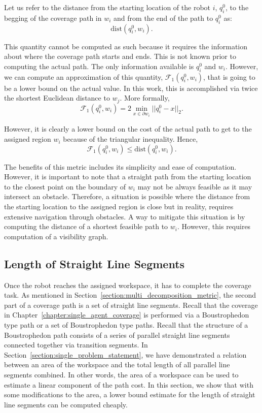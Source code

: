 \documentclass[../main.tex]{subfiles}
\begin{document}
Let us refer to the distance from the starting location of the robot $i$, $q^0_i$, to the begging of the coverage path in $w_i$ and from the end of the path to $q^0_i$ as:
\begin{equation}
	\text{dist}(q^0_i,w_i).
\end{equation}

This quantity cannot be computed as such because it requires the information about where the coverage path starts and ends. This is not known prior to computing the actual path. The only information available is $q^0_i$ and $w_i$. However, we can compute an approximation of this quantity, $\mathcal{F}_1(q^0_i,w_i)$, that is going to be a lower bound on the actual value. In this work, this is accomplished via twice the shortest Euclidean distance to $w_j$. More formally, 
\begin{equation}
	\mathcal{F}_1(q^0_i,w_i)=2\min_{x\in\partial w_i}||q^0_i-x||_2.
\end{equation}

However, it is clearly a lower bound on the cost of the actual path to get to the assigned region $w_i$ because of the triangular inequality. Hence,
\begin{equation}
	\mathcal{F}_1(q^0_i,w_i)\leq\text{dist}(q^0_i,w_i).
\end{equation}

The benefits of this metric includes its simplicity and ease of computation. However, it is important to note that a straight path from the starting location to the closest point on the boundary of $w_i$ may not be always feasible as it may intersect an obstacle. Therefore, a situation is possible where the distance from the starting location to the assigned region is close but in reality, requires extensive navigation through obstacles. A way to mitigate this situation is by computing the distance of a shortest feasible path to $w_i$. However, this requires computation of a visibility graph.


\subsection{Length of Straight Line Segments}
\label{subsection:sum_straight_segments}

Once the robot reaches the assigned workspace, it has to complete the coverage task. As mentioned in Section~\ref{section:multi_decomposition_metric}, the second part of a coverage path is a set of straight line segments. Recall that the coverage in Chapter~\ref{chapter:single_agent_coverage} is performed via a Boustrophedon type path or a set of Boustrophedon type paths. Recall that the structure of a Boustrophedon path consists of a series of parallel straight line segments connected together via transition segments. In Section~\ref{section:single_problem_statement}, we have demonstrated a relation between an area of the workspace and the total length of all parallel line segments combined. In other words, the area of a workspace can be used to estimate a linear component of the path cost. In this section, we show that with some modifications to the area, a lower bound estimate for the length of straight line segments can be computed cheaply.
\end{document}
